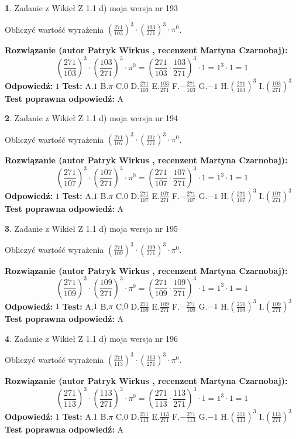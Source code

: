 \documentclass[12pt, a4paper]{article}
\theoremstyle{definition} %
\newtheorem{zad}{}
\newcommand{\zadStart}[1]{\begin{zad}#1\newline}
\newcommand{\zadStop}{\end{zad}}
\newcommand{\rozwStart}[2]{\noindent \textbf{Rozwiązanie (autor #1 , recenzent #2): }\newline}
\newcommand{\rozwStop}{\newline}
\newcommand{\odpStart}{\noindent \textbf{Odpowiedź:}\newline}
\newcommand{\odpStop}{\newline}
\newcommand{\testStart}{\noindent \textbf{Test:}\newline}
\newcommand{\testStop}{\newline}
\newcommand{\kluczStart}{\noindent \textbf{Test poprawna odpowiedź:}\newline}
\newcommand{\kluczStop}{\newline}
\begin{document}
\zadStart{Zadanie z Wikieł Z 1.1 d) moja wersja nr 193}

Obliczyć wartość wyrażenia $(\frac{271}{103})^{3} \cdot (\frac{103}{271})^{3} \cdot \pi^{0}$.
\zadStop
\rozwStart{Patryk Wirkus}{Martyna Czarnobaj}
$$(\frac{271}{103})^{3} \cdot (\frac{103}{271})^{3} \cdot \pi^{0} = (\frac{271}{103} \cdot \frac{103}{271})^{3} \cdot 1 = 1^{3} \cdot 1 = 1$$
\rozwStop
\odpStart
$1$
\odpStop
\testStart
A.$1$ B.$\pi$ C.$0$ D.$\frac{271}{103}$ E.$\frac{103}{271}$
F.$-\frac{271}{103}$ G.$-1$
H.$(\frac{271}{103})^{3}$
I.$(\frac{103}{271})^{3}$
\testStop
\kluczStart
A
\kluczStop



\zadStart{Zadanie z Wikieł Z 1.1 d) moja wersja nr 194}

Obliczyć wartość wyrażenia $(\frac{271}{107})^{3} \cdot (\frac{107}{271})^{3} \cdot \pi^{0}$.
\zadStop
\rozwStart{Patryk Wirkus}{Martyna Czarnobaj}
$$(\frac{271}{107})^{3} \cdot (\frac{107}{271})^{3} \cdot \pi^{0} = (\frac{271}{107} \cdot \frac{107}{271})^{3} \cdot 1 = 1^{3} \cdot 1 = 1$$
\rozwStop
\odpStart
$1$
\odpStop
\testStart
A.$1$ B.$\pi$ C.$0$ D.$\frac{271}{107}$ E.$\frac{107}{271}$
F.$-\frac{271}{107}$ G.$-1$
H.$(\frac{271}{107})^{3}$
I.$(\frac{107}{271})^{3}$
\testStop
\kluczStart
A
\kluczStop



\zadStart{Zadanie z Wikieł Z 1.1 d) moja wersja nr 195}

Obliczyć wartość wyrażenia $(\frac{271}{109})^{3} \cdot (\frac{109}{271})^{3} \cdot \pi^{0}$.
\zadStop
\rozwStart{Patryk Wirkus}{Martyna Czarnobaj}
$$(\frac{271}{109})^{3} \cdot (\frac{109}{271})^{3} \cdot \pi^{0} = (\frac{271}{109} \cdot \frac{109}{271})^{3} \cdot 1 = 1^{3} \cdot 1 = 1$$
\rozwStop
\odpStart
$1$
\odpStop
\testStart
A.$1$ B.$\pi$ C.$0$ D.$\frac{271}{109}$ E.$\frac{109}{271}$
F.$-\frac{271}{109}$ G.$-1$
H.$(\frac{271}{109})^{3}$
I.$(\frac{109}{271})^{3}$
\testStop
\kluczStart
A
\kluczStop



\zadStart{Zadanie z Wikieł Z 1.1 d) moja wersja nr 196}

Obliczyć wartość wyrażenia $(\frac{271}{113})^{3} \cdot (\frac{113}{271})^{3} \cdot \pi^{0}$.
\zadStop
\rozwStart{Patryk Wirkus}{Martyna Czarnobaj}
$$(\frac{271}{113})^{3} \cdot (\frac{113}{271})^{3} \cdot \pi^{0} = (\frac{271}{113} \cdot \frac{113}{271})^{3} \cdot 1 = 1^{3} \cdot 1 = 1$$
\rozwStop
\odpStart
$1$
\odpStop
\testStart
A.$1$ B.$\pi$ C.$0$ D.$\frac{271}{113}$ E.$\frac{113}{271}$
F.$-\frac{271}{113}$ G.$-1$
H.$(\frac{271}{113})^{3}$
I.$(\frac{113}{271})^{3}$
\testStop
\kluczStart
A
\kluczStop
\end{document}
